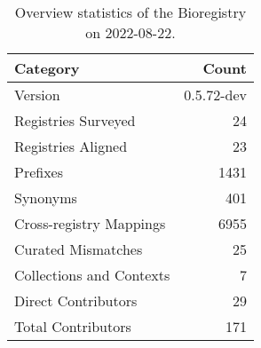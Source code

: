 \begin{table}
\centering
\caption{Overview statistics of the Bioregistry on 2022-08-22.}
\label{tab:bioregistry-summary}
\begin{tabular}{lr}
\toprule
                Category &      Count \\
\midrule
                 Version & 0.5.72-dev \\
     Registries Surveyed &         24 \\
      Registries Aligned &         23 \\
                Prefixes &       1431 \\
                Synonyms &        401 \\
 Cross-registry Mappings &       6955 \\
      Curated Mismatches &         25 \\
Collections and Contexts &          7 \\
     Direct Contributors &         29 \\
      Total Contributors &        171 \\
\bottomrule
\end{tabular}
\end{table}

